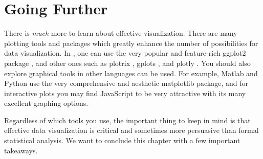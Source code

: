 \section{Going Further}
There is \textit{much} more to learn about effective visualization. There are
many plotting tools and packages which greatly enhance the number of
possibilities for data visualization. In \R, one can use the very popular and
feature-rich ggplot2 package \citep{ggplot2}, and other ones such as plotrix
\citep{plotrix}, gplots \citep{warnes2016package}, and plotly \citep{plotly}.
You should also explore graphical tools in other languages can be used. For
example, Matlab and Python use the very comprehensive and aesthetic matplotlib
package, and for interactive plots you may find JavaScript to be very
attractive with its many excellent graphing options.

Regardless of which tools you use, the important thing to keep in mind is that
effective data visualization is critical and sometimes more persuasive than
formal statistical analysis. We want to conclude this chapter with a few
important takeaways.

